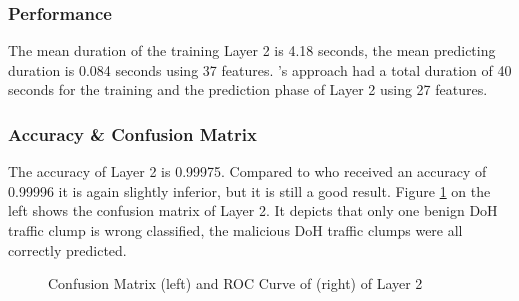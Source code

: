 \subsubsection{Performance}
The mean duration of the training Layer 2 is 4.18 seconds, the mean predicting duration is 0.084 seconds using 37 features. \cite{BehnkeEtAl_FeatureEngineeringMLModelMaliciusDoHTraffic}'s approach had a total duration of 40 seconds for the training and the prediction phase of Layer 2 using 27 features.

\subsubsection{Accuracy \& Confusion Matrix}
The accuracy of Layer 2 is 0.99975. Compared to \cite{BehnkeEtAl_FeatureEngineeringMLModelMaliciusDoHTraffic} who received an accuracy of 0.99996 it is again slightly inferior, but it is still a good result. Figure \ref{fig:con_roc_l2} on the left shows the confusion matrix of Layer 2. It depicts that only one benign DoH traffic clump is wrong classified, the malicious DoH traffic clumps were all correctly predicted.

\begin{figure}[ht]
\centering
{}\hspace{1.0cm}
\caption{Confusion Matrix (left) and ROC Curve of (right) of Layer 2}
\label{fig:con_roc_l2}
\end{figure}

